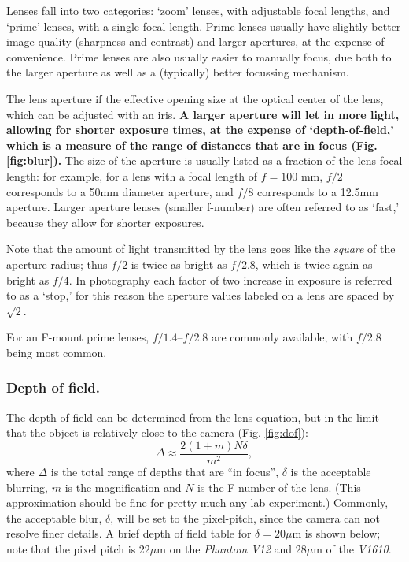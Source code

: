 \documentclass[11pt]{amsart}
\begin{document}
Lenses fall into two categories: `zoom' lenses, with adjustable focal lengths, and `prime' lenses, with a single focal length.
Prime lenses usually have slightly better image quality (sharpness and contrast) and larger apertures, at the expense of convenience.
Prime lenses are also usually easier to manually focus, due both to the larger aperture as well as a (typically) better focussing mechanism.

The lens aperture if the effective opening size at the optical center of the lens, which can be adjusted with an iris.
{\bf A larger aperture will let in more light, allowing for shorter exposure times, at the expense of `depth-of-field,' which is a measure of the range of distances that are in focus (Fig. \ref{fig:blur}).}
The size of the aperture is usually listed as a fraction of the lens focal length: for example, for a lens with a focal length of $f=100$ mm, $f/2$ corresponds to a 50mm diameter aperture, and $f/8$ corresponds to a 12.5mm aperture.
Larger aperture lenses (smaller f-number) are often referred to as `fast,' because they allow for shorter exposures.

Note that the amount of light transmitted by the lens goes like the \emph{square} of the aperture radius; thus $f/2$ is twice as bright as $f/2.8$, which is twice again as bright as $f/4$.
In photography each factor of two increase in exposure is referred to as a `stop,' for this reason the aperture values labeled on a lens are spaced by $\sqrt{2}$.

For an F-mount prime lenses, $f/1.4$--$f/2.8$ are commonly available, with $f/2.8$ being most common. %

\subsubsection{Depth of field.}


The depth-of-field can be determined from the lens equation, but in the limit that the object is relatively close to the camera (Fig. \ref{fig:dof}):
$$
\Delta \approx \frac{2 \left(1 + m\right) N \delta}{m^2},
$$
where $\Delta$ is the total range of depths that are ``in focus'', $\delta$ is the acceptable blurring, $m$ is the magnification and  $N$ is the F-number of the lens.
(This approximation should be fine for pretty much any lab experiment.)
Commonly, the acceptable blur, $\delta$, will be set to the pixel-pitch, since the camera can not resolve finer details.
A brief depth of field table for $\delta=20\mu$m is shown below; note that the pixel pitch is 22$\mu$m on the \emph{Phantom V12} and 28$\mu$m of the \emph{V1610}.
\end{document}
